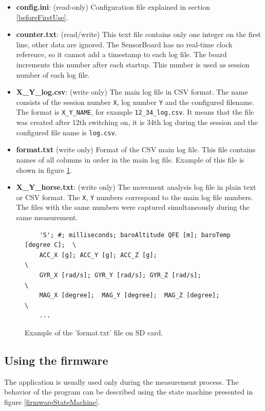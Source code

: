 \begin{itemize}
    \item \textbf{config.ini}: (read-only) Configuration file explained in section \ref{beforeFirstUse}.
    \item \textbf{counter.txt}: (read/write) This text file contains only one integer on the first line, other data are ignored. The SensorBoard has no real-time clock reference, so it cannot add a timestamp to each log file. The board increments this number after each startup. This number is used as session number of each log file.
    \item \textbf{X\_Y\_log.csv}: (write only) The main log file in CSV format. The name consists of the session number \texttt{X}, log number \texttt{Y} and the configured filename. The format is \texttt{X\_Y\_NAME}, for example \texttt{12\_34\_log.csv}. It means that the file was created after 12th switching on, it is 34th log during the session and the configured file name is \texttt{log.csv}.
    \item \textbf{format.txt} (write only) Format of the CSV main log file. This file contains names of all columns in order in the main log file. Example of this file is shown in figure \ref{formatFile}.
    \item \textbf{X\_Y\_horse.txt}: (write only) The movement analysis log file in plain text or CSV format. The \texttt{X}, \texttt{Y} numbers correspond to the main log file numbers. The files with the same numbers were captured simultaneously during the same measurement.
\end{itemize}

\begin{figure}
    \centering
    \label{formatFile}
    \caption{Example of the 'format.txt' file on SD card.}
    \begin{verbatim}
    'S'; #; milliseconds; baroAltitude QFE [m]; baroTemp [degree C];  \
    ACC_X [g]; ACC_Y [g]; ACC_Z [g];                                  \
    GYR_X [rad/s]; GYR_Y [rad/s]; GYR_Z [rad/s];                      \
    MAG_X [degree];  MAG_Y [degree];  MAG_Z [degree];                 \
    ...
    \end{verbatim}
\end{figure}

\subsection{Using the firmware}
The application is usually used only during the measurement process. The behavior of the program can be described using the state machine presented in figure \ref{firmwareStateMachine}.

